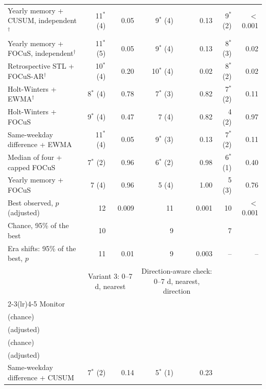 {\begin{longtable}{@{}lrrrrrr@{}}
Yearly memory + CUSUM, independent$^{\dagger}$ & 11$^{*}$ (4) & 0.05 & 9$^{*}$ (4) & 0.13 & 9$^{*}$ (2) & $<$0.001 \\
Yearly memory + FOCuS, independent$^{\dagger}$ & 11$^{*}$ (5) & 0.05 & 9$^{*}$ (4) & 0.13 & 8$^{*}$ (3) & 0.02 \\
Retrospective STL + FOCuS-AR$^{\dagger}$ & 10$^{*}$ (4) & 0.20 & 10$^{*}$ (4) & 0.02 & 8$^{*}$ (2) & 0.02 \\
Holt-Winters + EWMA$^{\dagger}$ & 8$^{*}$ (4) & 0.78 & 7$^{*}$ (3) & 0.82 & 7$^{*}$ (2) & 0.11 \\
Holt-Winters + FOCuS & 9$^{*}$ (4) & 0.47 & 7 (4) & 0.82 & 4 (2) & 0.97 \\
Same-weekday difference + EWMA & 11$^{*}$ (4) & 0.05 & 9$^{*}$ (3) & 0.13 & 7$^{*}$ (2) & 0.11 \\
Median of four + capped FOCuS & 7$^{*}$ (2) & 0.96 & 6$^{*}$ (2) & 0.98 & 6$^{*}$ (1) & 0.40 \\
Yearly memory + FOCuS & 7 (4) & 0.96 & 5 (4) & 1.00 & 5 (3) & 0.76 \\
\addlinespace
Best observed, $p$ (adjusted) & 12 & 0.009 & 11 & 0.001 & 10 & $<$0.001 \\
Chance, 95\% of the best & 10 &  & 9 &  & 7 &  \\
Era shifts: 95\% of the best, $p$ & 11 & 0.01 & 9 & 0.003 & -- & -- \\
\midrule
 & \multicolumn{2}{c}{\parbox[b]{2.7cm}{\centering Variant 3: 0--7 d, nearest}} & \multicolumn{2}{c}{\parbox[b]{2.7cm}{\centering Direction-aware check: 0--7 d, nearest, direction}} &  &  \\
\cmidrule(lr){2-3}\cmidrule(lr){4-5}
Monitor & \begin{tabular}[b]{@{}c@{}}Ep.\\(chance)\end{tabular} & \begin{tabular}[b]{@{}c@{}}$p$\\(adjusted)\end{tabular} & \begin{tabular}[b]{@{}c@{}}Ep.\\(chance)\end{tabular} & \begin{tabular}[b]{@{}c@{}}$p$\\(adjusted)\end{tabular} &  &  \\
\midrule
Same-weekday difference + CUSUM & 7$^{*}$ (2) & 0.14 & 5$^{*}$ (1) & 0.23 &  &  \\

\end{longtable}}
